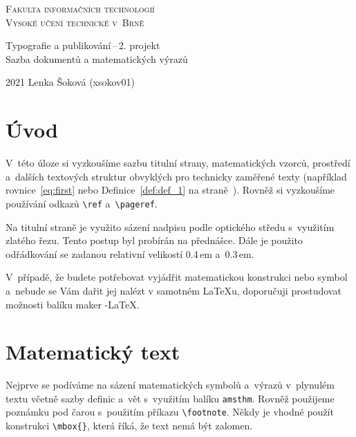 \documentclass[11pt, twocolumn, a4paper]{article}
\begin{document}
\begin{titlepage}
\begin{center}
    \Huge
    \textsc{Fakulta informačních technologií\\
    Vysoké učení technické v~Brně}\\
    
    
    \LARGE Typografie a publikování\,--\,2. projekt\\
    Sazba dokumentů a matematických výrazů
    
\end{center}
{\Large
2021
\hfill Lenka Šoková (xsokov01)}
\end{titlepage}

\section*{Úvod}
\setlength{\parindent}{11pt}
V~této úloze si vyzkoušíme sazbu titulní strany, matematických vzorců, prostředí a~dalších textových struktur obvyklých pro technicky zaměřené texty (například rovnice~\eqref{eq:first} nebo Definice~\ref{def:def_1} na straně~\pageref{def:def_1}). Rovněž si vyzkoušíme používání odkazů \verb|\ref| a~\verb|\pageref|.

Na titulní straně je využito sázení nadpisu podle optického středu s~využitím zlatého řezu. Tento postup byl
probírán na přednášce. Dále je použito odřádkování se
zadanou relativní velikostí 0.4\,em a~0.3\,em.

V~případě, že budete potřebovat vyjádřit matematickou
konstrukci nebo symbol a~nebude se Vám dařit jej nalézt
v samotném \LaTeX u, doporučuji prostudovat možnosti balíku maker \AmS-\LaTeX.

\section{Matematický text}
\setlength{\parindent}{11pt}
Nejprve se podíváme na sázení matematických symbolů
a~výrazů v~plynulém textu včetně sazby definic a~vět s~využitím balíku \verb|amsthm|. Rovněž použijeme poznámku pod
čarou s~použitím příkazu \verb|\footnote|. Někdy je vhodné
použít konstrukci \verb|\mbox{}|, která říká, že text nemá být
zalomen.
\end{document}
